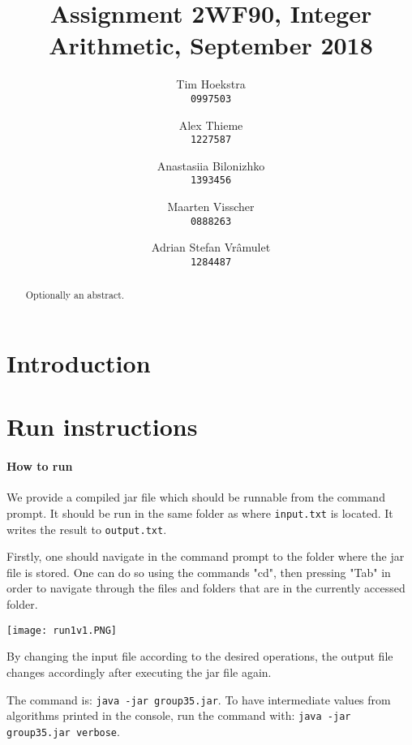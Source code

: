 \documentclass[a4paper]{article}
\title{Assignment 2WF90, Integer Arithmetic, September 2018}
\author{
    Tim Hoekstra\\
    \texttt{0997503}
    \and
    Alex Thieme\\
    \texttt{1227587}
    \and
    Anastasiia Bilonizhko\\
    \texttt{1393456}
    \and
    Maarten Visscher\\
    \texttt{0888263}
    \and
    Adrian Stefan Vr\^amulet\\
    \texttt{1284487}
}
\begin{document}
\maketitle



\begin{abstract}
Optionally an abstract.
\end{abstract}

\section*{Introduction}

\tableofcontents




\section{Run instructions}



\paragraph{How to run}

We provide a compiled jar file which should be runnable from the command prompt.
It should be run in the same folder as where \texttt{input.txt} is located.
It writes the result to \texttt{output.txt}.

Firstly, one should navigate in the command prompt to the folder where the jar file is stored. One can do so using the commands "cd", then pressing "Tab" in order to navigate through the files and folders that are in the currently accessed folder. 

\texttt{[image: run1v1.PNG]}


By changing the input file according to the desired operations, the output file changes accordingly after executing the jar file again. 

The command is: \texttt{java -jar group35.jar}.
To have intermediate values from algorithms printed in the console, run the command with:
\texttt{java -jar group35.jar verbose}.
\end{document}
